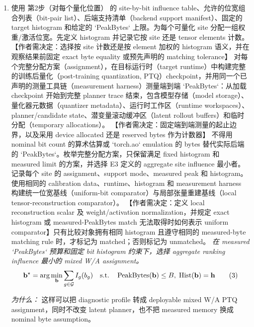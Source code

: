 \documentclass[10pt,a4paper]{article}
\begin{document}
\begin{enumerate}[leftmargin=*,start=2]
  \item 使用 第2步（对每个量化位置） 的 site-by-bit influence table、允许的位宽组合列表（bit-pair list）、后端支持清单（backend support manifest）、固定的 target histogram 和给定的 `PeakBytes` 上限。为每个可量化 site 分配一组权重/激活位宽。先定义 histogram 并记录它按 site 还是 tensor elements 计数。 【作者需决定：选择按 site 计数还是按 element 加权的 histogram 语义，并在观察结果前固定 exact byte equality 或预先声明的 matching tolerance】 对每个完整分配方案（assignment），在目标运行时（target runtime）中构建完整的训练后量化（post-training quantization, PTQ）checkpoint，并用同一个已声明的测量工具链（measurement harness）测量端到端 `PeakBytes`：从加载 checkpoint 开始到完整 planner trace 结束，包含模型存储（model storage）、量化器元数据（quantizer metadata）、运行时工作区（runtime workspaces）、planner/candidate state、潜变量滚动缓冲区（latent rollout buffers）和临时分配（temporary allocations）。 【作者需决定：固定端到端测量的起止边界，以及采用 device allocated 还是 reserved bytes 作为计数器】 不得用 nominal bit count 的算术估算或 `torch.ao` emulation 的 bytes 替代实际后端的 `PeakBytes`。枚举完整分配方案，只保留满足 fixed histogram 和 measured limit 的方案，并选择 E3 定义的 aggregate site influence 最小者。记录每个 site 的 assignment、support mode、measured peak 和 histogram。使用相同的 calibration data、runtime、histogram 和 measurement harness 构建统一位宽基线（uniform-bit comparator）与局部张量重建基线（local tensor-reconstruction comparator）。 【作者需决定：定义 local reconstruction scalar 及 weight/activation normalization，并规定 exact histogram 或 measured-PeakBytes match 无法取得时如何表示 uniform comparator】只有比较对象拥有相同 histogram 且遵守相同的 measured-byte matching rule 时，才标记为 matched；否则标记为 unmatched。
\noindent\emph{在 measured `PeakBytes` 预算和固定 bit histogram 约束下，选择 aggregate ranking influence 最小的 mixed W/A assignment。}
\begin{equation}
\resizebox{\ifdim\width>\linewidth \linewidth\else\width\fi}{!}{$\displaystyle \mathbf{b}^{\star}=\arg\min_{\mathbf{b}}\sum_{g\in\mathcal{G}}I_g(b_g)\quad\text{s.t.}\quad\operatorname{PeakBytes}(\mathbf{b})\le B,\;\operatorname{Hist}(\mathbf{b})=\mathbf{h}$} \tag{3}
\end{equation}
\par\emph{为什么：} 这样可以把 diagnostic profile 转成 deployable mixed W/A PTQ assignment，同时不改变 latent planner，也不把 measured memory 换成 nominal byte assumption。
\end{enumerate}
\end{document}
